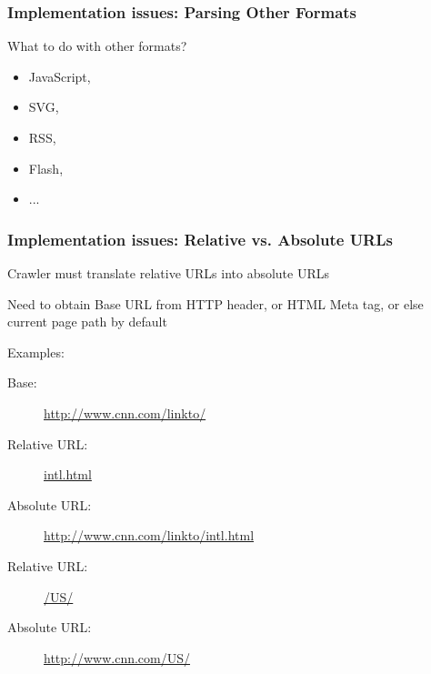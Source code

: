 \documentclass{beamer}
\begin{document}
\begin{frame} \frametitle{Implementation issues: Parsing Other Formats}


\begin{block}{What to do with other formats?}

\begin{itemize}
\item JavaScript, 
\item SVG, 
\item RSS, 
\item Flash,
\item ...

\end{itemize}

\end{block}

\end{frame}

\begin{frame} \frametitle{Implementation issues: Relative vs. Absolute URLs}


Crawler must translate relative URLs into absolute URLs

Need to obtain Base URL from HTTP header, or HTML Meta tag, or else current page path by default

\begin{block}{Examples:}
\begin{description}
\item[Base:] \url{http://www.cnn.com/linkto/}
\item [Relative URL:] \url{intl.html}
\item [Absolute URL:] \url{http://www.cnn.com/linkto/intl.html}
\item [Relative URL:] \url{/US/}
\item [Absolute URL:] \url{http://www.cnn.com/US/}
\end{description}
\end{block}

\end{frame}
\end{document}
